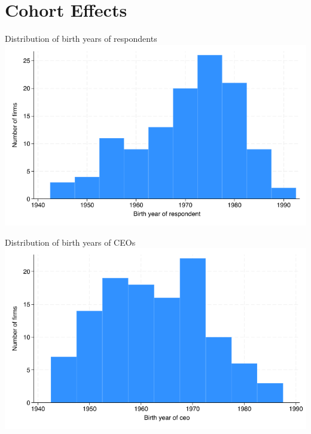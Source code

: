 \documentclass[
  ignorenonframetext,
  aspectratio=1610,
]{beamer}
\begin{document}
\section{Cohort Effects}\label{cohort-effects}

\begin{frame}{Distribution of birth years of respondents}
\protect\hypertarget{distribution-of-birth-years-of-respondents}{}
\includegraphics{fig/cohort-respondent-histogram.png}
\end{frame}

\begin{frame}{Distribution of birth years of CEOs}
\protect\hypertarget{distribution-of-birth-years-of-ceos}{}
\includegraphics{fig/cohort-ceo-histogram.png}
\end{frame}
\end{document}
